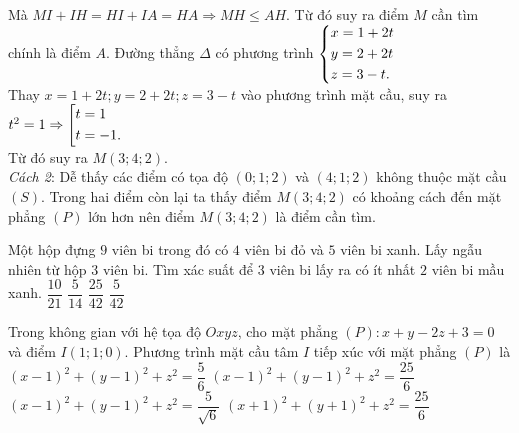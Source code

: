 \begin{ex}
{Mà $MI+IH=HI+IA=HA \Rightarrow MH\leq AH$. Từ đó suy ra điểm $M$ cần tìm chính là điểm $A$.
Đường thẳng $\Delta$ có phương trình $\left\{\begin{aligned}&x=1+2t\\&y=2+2t\\&z=3-t.\end{aligned}\right.$\\
Thay $x=1+2t; y=2+2t; z=3-t$ vào phương trình mặt cầu, suy ra $t^2=1 \Rightarrow \left[\begin{aligned}&t=1\\&t=-1.\end{aligned}\right.$\\
Từ đó suy ra $M(3;4;2)$.\\
\emph{Cách 2}: Dễ thấy các điểm có tọa độ $(0;1;2)$ và $(4;1;2)$ không thuộc mặt cầu $(S)$. Trong hai điểm còn lại ta thấy điểm $M(3;4;2)$ có khoảng cách đến mặt phẳng $(P)$ lớn hơn nên điểm $M(3;4;2)$ là điểm cần tìm.
}
\end{ex}

\begin{ex}%
Một hộp đựng $9$ viên bi trong đó có $4$ viên bi đỏ và $5$ viên bi xanh. Lấy ngẫu nhiên từ hộp $3$ viên bi. Tìm xác suất để $3$ viên bi lấy ra có ít nhất $2$ viên bi mầu xanh.
\choice
{$\dfrac{10}{21}$}
{$\dfrac{5}{14}$}
{\True $\dfrac{25}{42}$}
{$\dfrac{5}{42}$}
\end{ex}

\begin{ex}%
Trong không gian với hệ tọa độ $Oxyz$, cho mặt phẳng $(P): x+y-2z+3=0$ và điểm $I(1;1;0)$. Phương trình mặt cầu tâm $I$ tiếp xúc với mặt phẳng $(P)$ là
\choice
{$(x-1)^2+(y-1)^2+z^2=\dfrac{5}{6}$}
{\True $(x-1)^2+(y-1)^2+z^2=\dfrac{25}{6}$}
{$(x-1)^2+(y-1)^2+z^2=\dfrac{5}{\sqrt{6}}$}
{$(x+1)^2+(y+1)^2+z^2=\dfrac{25}{6}$}
\end{ex}


